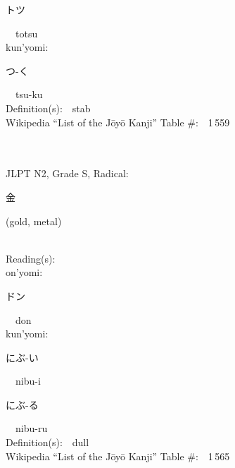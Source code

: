 \begin{multicols}{2}
{\hspace*{2em}}{\begin{CJK}{UTF8}{min} トツ \end{CJK}}\ \ totsu\ \ \\
{\hspace*{1em}}kun'yomi:\ \ \\
{\hspace*{2em}}{\begin{CJK}{UTF8}{min} つ-く \end{CJK}}\ \ tsu-ku\ \ \\
Definition(s):\ \ stab \\
Wikipedia ``List of the J\=oy\=o Kanji'' Table \#:\ \ 1\,559 \\
\ \ \\
{\fontsize{34pt}{40pt}  }\ \ \\  %
{JLPT N2, Grade S, Radical:\ \ {\begin{CJK}{UTF8}{min} 金 \end{CJK}} (gold, metal) } \\
Reading(s):\ \ \\
{\hspace*{1em}}on'yomi:\ \ \\
{\hspace*{2em}}{\begin{CJK}{UTF8}{min} ドン \end{CJK}}\ \ don\ \ \\
{\hspace*{1em}}kun'yomi:\ \ \\
{\hspace*{2em}}{\begin{CJK}{UTF8}{min} にぶ-い \end{CJK}}\ \ nibu-i\ \ \\
{\hspace*{2em}}{\begin{CJK}{UTF8}{min} にぶ-る \end{CJK}}\ \ nibu-ru\ \ \\
Definition(s):\ \ dull \\
Wikipedia ``List of the J\=oy\=o Kanji'' Table \#:\ \ 1\,565 \\
\ \ \\
{\fontsize{34pt}{40pt}  }\ \ \\  %

\end{multicols}
